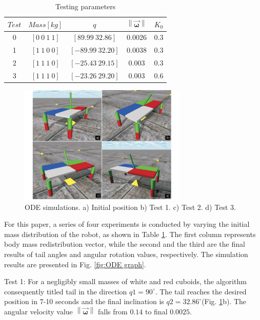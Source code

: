 \begin{table}
	\centering
\begin{tabular}{|c|c|c|c|c|}
	\hline
$Test$ &  $Mass[kg]$ & $q$  & $\left \| \vec{\boldsymbol{\omega}} \right \|$ & $K_0$\\
	\hline
0   & $[0\: 0\: 1\: 1]$ & $[89.99\: 32.86]$ & 0.0026 & 0.3\\
1   & $[1\: 1\: 0\: 0]$ & $[-89.99\: 32.20]$ & 0.0038 & 0.3\\
2   & $[1\: 1\: 1\: 0]$ & $[-25.43\: 29.15]$ &  0.003 & 0.3\\
3   & $[1\: 1\: 1\: 0]$ & $[-23.26\: 29.20]$ &  0.003 & 0.6\\
\hline
\end{tabular}
\caption{Testing parameters}\label{tab:Simulations}
\end{table}



\begin{figure}
	\centering
	\includegraphics[width=80mm]{./pictures/ODE_simulations.pdf}
	\caption{ODE simulations. a) Initial position b) Test 1. c) Test 2. d) Test 3.}
	\label{fig:ODESimulations}
\end{figure}

For this paper, a series of four experiments is conducted by varying the initial mass distribution of the robot, as shown in Table \ref{tab:Simulations}. The first column represents body mass redistribution vector, while the second and the third are the final results of tail angles and angular rotation values, respectively. The simulation results are presented in Fig. \ref{fig:ODE graph}. 

Test 1: For a negligibly small masses of white and red cuboids, the algorithm consequently titled tail in the direction $q1=90^{\circ}$. The tail reaches the desired position in 7-10 seconds and the final inclination is $q2=32.86^{\circ}$(Fig. \ref{fig:ODESimulations}b). The angular velocity value $\left \| \vec{\boldsymbol{\omega}} \right \|$ falls from $0.14$ to final $0.0025$.

